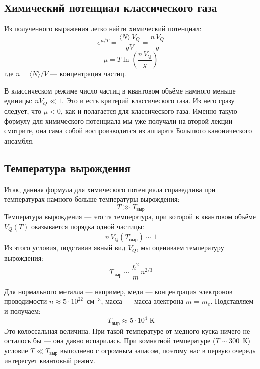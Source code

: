 \documentclass[../general/general]{subfiles}
\begin{document}
\subsection{Химический потенциал классического газа}

Из полученного выражения легко найти химический потенциал:
\begin{equation}
    e^{\mu/T} = \frac{\langle N \rangle\, V_Q}{g V} = \frac{n\, V_Q}{g}
\end{equation}
\begin{equation}
    \mu = T \ln\!\left( \frac{n\, V_Q}{g} \right)
\end{equation}
где $n = \langle N \rangle / V$ — концентрация частиц.

В классическом режиме число частиц в квантовом объёме намного меньше единицы: $n V_Q \ll 1$. Это и есть критерий классического газа. Из него сразу следует, что $\mu < 0$, как и полагается для классического газа. Именно такую формулу для химического потенциала мы уже получали на второй лекции — смотрите, она сама собой воспроизводится из аппарата Большого канонического ансамбля.

\subsection{Температура вырождения}

Итак, данная формула для химического потенциала справедлива при температурах намного больше температуры вырождения:
\begin{equation}
    T \gg T_{\text{выр}}
\end{equation}
Температура вырождения — это та температура, при которой в квантовом объёме $V_Q(T)$ оказывается порядка одной частицы:
\begin{equation}
    n\, V_Q(T_{\text{выр}}) \sim 1
\end{equation}
Из этого условия, подставив явный вид $V_Q$, мы оцениваем температуру вырождения:
\begin{equation}
    T_{\text{выр}} \sim \frac{\hbar^2}{m}\, n^{2/3}
\end{equation}

Для нормального металла — например, меди — концентрация электронов проводимости $n \approx 5 \cdot 10^{22}$~см$^{-3}$, масса — масса электрона $m = m_e$. Подставляем и получаем:
\begin{equation}
    T_{\text{выр}} \approx 5 \cdot 10^4 \text{ К}
\end{equation}
Это колоссальная величина. При такой температуре от медного куска ничего не осталось бы — она давно испарилась. При комнатной температуре ($T \sim 300$~К) условие $T \ll T_{\text{выр}}$ выполнено с огромным запасом, поэтому нас в первую очередь интересует квантовый режим.
\end{document}
